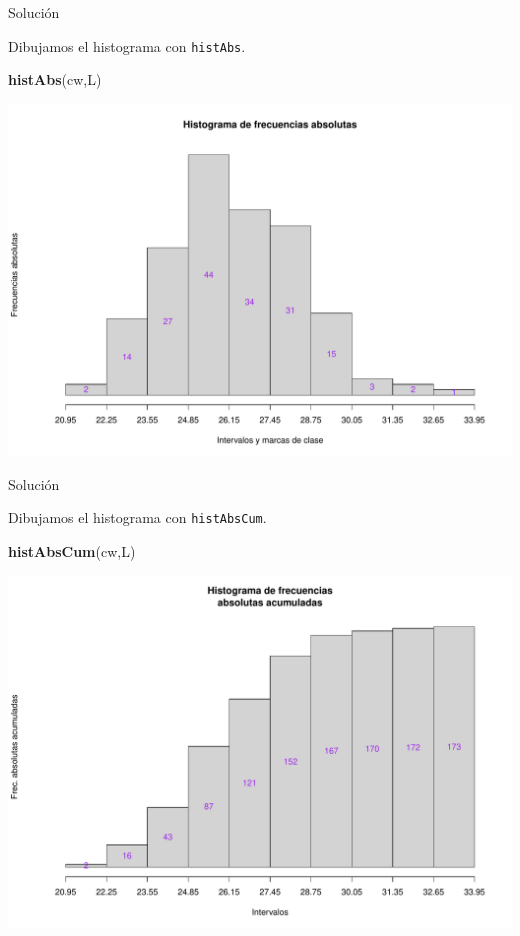 \documentclass[
  ignorenonframetext,
]{beamer}
\newenvironment{Shaded}{\begin{snugshade}}{\end{snugshade}}
\newcommand{\KeywordTok}[1]{\textcolor[rgb]{0.13,0.29,0.53}{\textbf{#1}}}
\newcommand{\NormalTok}[1]{#1}
\begin{document}
\begin{frame}[fragile]{Solución}
\protect\hypertarget{soluciuxf3n-39}{}

Dibujamos el histograma con \texttt{histAbs}.

\begin{Shaded}
\begin{Highlighting}[]
\KeywordTok{histAbs}\NormalTok{(cw,L)}
\end{Highlighting}
\end{Shaded}

\includegraphics{Tema9.-Agrupacion_datos_cuantitativos_files/figure-beamer/unnamed-chunk-54-1.pdf}

\end{frame}

\begin{frame}[fragile]{Solución}
\protect\hypertarget{soluciuxf3n-40}{}

Dibujamos el histograma con \texttt{histAbsCum}.

\begin{Shaded}
\begin{Highlighting}[]
\KeywordTok{histAbsCum}\NormalTok{(cw,L)}
\end{Highlighting}
\end{Shaded}

\includegraphics{Tema9.-Agrupacion_datos_cuantitativos_files/figure-beamer/unnamed-chunk-55-1.pdf}

\end{frame}
\end{document}
